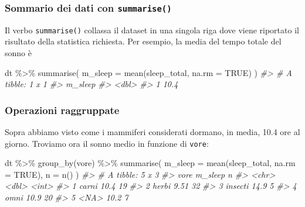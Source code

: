 \documentclass[
  11pt,
]{krantz}
\makeatletter
\newenvironment{Shaded}{\begin{snugshade}}{\end{snugshade}}
\newcommand{\AttributeTok}[1]{\textcolor[rgb]{0.61,0.61,0.61}{#1}}
\newcommand{\CommentTok}[1]{\textcolor[rgb]{0.37,0.37,0.37}{\textit{#1}}}
\newcommand{\ConstantTok}[1]{\textcolor[rgb]{0,0,0}{#1}}
\newcommand{\FunctionTok}[1]{\textcolor[rgb]{0,0,0}{#1}}
\newcommand{\NormalTok}[1]{#1}
\newcommand{\SpecialCharTok}[1]{\textcolor[rgb]{0,0,0}{#1}}
\newenvironment{kframe}{%
\medskip{}
\setlength{\fboxsep}{.8em}
 \def\at@end@of@kframe{}%
 \ifinner\ifhmode%
  \def\at@end@of@kframe{\end{minipage}}%
  \begin{minipage}{\columnwidth}%
 \fi\fi%
 \def\FrameCommand##1{\hskip\@totalleftmargin \hskip-\fboxsep
 \colorbox{shadecolor}{##1}\hskip-\fboxsep
     \hskip-\linewidth \hskip-\@totalleftmargin \hskip\columnwidth}%
 \MakeFramed {\advance\hsize-\width
   \@totalleftmargin\z@ \linewidth\hsize
   \@setminipage}}%
 {\par\unskip\endMakeFramed%
 \at@end@of@kframe}
\renewenvironment{Shaded}{\begin{kframe}}{\end{kframe}}
\theoremstyle{definition}
\theoremstyle{definition}
\theoremstyle{definition}
\theoremstyle{definition}
\theoremstyle{remark}
\makeatother
\begin{document}
\hypertarget{sommario-dei-dati-con-summarise}{%
\subsubsection{\texorpdfstring{Sommario dei dati con \texttt{summarise()}}{Sommario dei dati con summarise()}}\label{sommario-dei-dati-con-summarise}}

Il verbo \texttt{summarise()} collassa il dataset in una singola riga dove viene riportato il risultato della statistica richiesta. Per esempio, la media del tempo totale del sonno è

\begin{Shaded}
\begin{Highlighting}[]
\NormalTok{dt }\SpecialCharTok{\%\textgreater{}\%} 
  \FunctionTok{summarise}\NormalTok{(}
    \AttributeTok{m\_sleep =} \FunctionTok{mean}\NormalTok{(sleep\_total, }\AttributeTok{na.rm =} \ConstantTok{TRUE}\NormalTok{)}
\NormalTok{  ) }
\CommentTok{\#\textgreater{} \# A tibble: 1 x 1}
\CommentTok{\#\textgreater{}   m\_sleep}
\CommentTok{\#\textgreater{}     \textless{}dbl\textgreater{}}
\CommentTok{\#\textgreater{} 1    10.4}
\end{Highlighting}
\end{Shaded}

\hypertarget{operazioni-raggruppate}{%
\subsubsection{Operazioni raggruppate}\label{operazioni-raggruppate}}

Sopra abbiamo visto come i mammiferi considerati dormano, in media, 10.4 ore al giorno. Troviamo ora il sonno medio in funzione di \texttt{vore}:

\begin{Shaded}
\begin{Highlighting}[]
\NormalTok{dt }\SpecialCharTok{\%\textgreater{}\%}
  \FunctionTok{group\_by}\NormalTok{(vore) }\SpecialCharTok{\%\textgreater{}\%}
  \FunctionTok{summarise}\NormalTok{(}
    \AttributeTok{m\_sleep =} \FunctionTok{mean}\NormalTok{(sleep\_total, }\AttributeTok{na.rm =} \ConstantTok{TRUE}\NormalTok{), }
    \AttributeTok{n =} \FunctionTok{n}\NormalTok{()}
\NormalTok{  )}
\CommentTok{\#\textgreater{} \# A tibble: 5 x 3}
\CommentTok{\#\textgreater{}   vore    m\_sleep     n}
\CommentTok{\#\textgreater{}   \textless{}chr\textgreater{}     \textless{}dbl\textgreater{} \textless{}int\textgreater{}}
\CommentTok{\#\textgreater{} 1 carni     10.4     19}
\CommentTok{\#\textgreater{} 2 herbi      9.51    32}
\CommentTok{\#\textgreater{} 3 insecti   14.9      5}
\CommentTok{\#\textgreater{} 4 omni      10.9     20}
\CommentTok{\#\textgreater{} 5 \textless{}NA\textgreater{}      10.2      7}
\end{Highlighting}
\end{Shaded}
\end{document}
